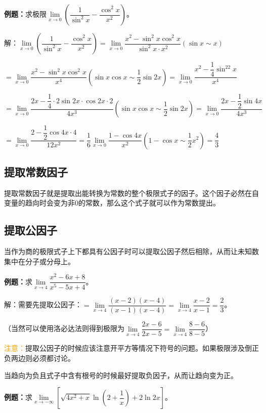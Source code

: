 \textbf{例题：}求极限$\lim\limits_{x\to 0}\left(\dfrac{1}{\sin^2x}-\dfrac{\cos^2x}{x^2}\right)$。\medskip

解：$\lim\limits_{x\to 0}\left(\dfrac{1}{\sin^2x}-\dfrac{\cos^2x}{x^2}\right)=\lim\limits_{x\to 0}\dfrac{x^2-\sin^2x\cos^2x}{\sin^2x\cdot x^2} (\sin x\sim x)$ \medskip

$=\lim\limits_{x\to 0}\dfrac{x^2-\sin^2x\cos^2x}{x^4} (\sin x\cos x\sim\dfrac{1}{2}\sin 2x)=\lim\limits_{x\to 0}\dfrac{x^2-\dfrac{1}{4}\sin^22x}{x^4}$ \medskip

$=\lim\limits_{x\to 0}\dfrac{2x-\dfrac{1}{4}\cdot 2\sin 2x\cdot\cos 2x\cdot 2}{4x^3} (\sin x\cos x\sim\dfrac{1}{2}\sin 2x)=\lim\limits_{x\to 0}\dfrac{2x-\dfrac{1}{2}\sin 4x}{4x^3}$ \medskip

$=\lim\limits_{x\to 0}\dfrac{2-\dfrac{1}{2}\cos 4x\cdot 4}{12x^2}=\dfrac{1}{6}\lim\limits_{x\to 0}\dfrac{1-\cos 4x}{x^2} (1-\cos x\sim \dfrac{1}{2}x^2)=\dfrac{4}{3}$

\subsection{提取常数因子}

提取常数因子就是提取出能转换为常数的整个极限式子的因子。这个因子必然在自变量的趋向时会变为非0的常数，那么这个式子就可以作为常数提出。

\subsection{提取公因子}

当作为商的极限式子上下都具有公因子时可以提取公因子然后相除，从而让未知数集中在分子或分母上。

\textbf{例题：}求$\lim\limits_{x\to 4}\dfrac{x^2-6x+8}{x^5-5x+4}$。

解：需要先提取公因子：$=\lim\limits_{x\to 4}\dfrac{(x-2)(x-4)}{(x-1)(x-4)}=\lim\limits_{x\to 4}\dfrac{x-2}{x-1}=\dfrac{2}{3}$。

（当然可以使用洛必达法则得到极限为$\lim\limits_{x\to 4}\dfrac{2x-6}{2x-5}=\lim\limits_{x\to 4}\dfrac{8-6}{8-5}$）

\textcolor{orange}{注意：}提取公因子的时候应该注意开平方等情况下符号的问题。如果极限涉及倒正负两边则必须都讨论。

当趋向为负且式子中含有根号的时候最好提取负因子，从而让趋向变为正。\medskip

\textbf{例题：}求$\lim\limits_{x\to-\infty}\left[\sqrt{4x^2+x}\ln\left(2+\dfrac{1}{x}\right)+2\ln 2x\right]$。\medskip

